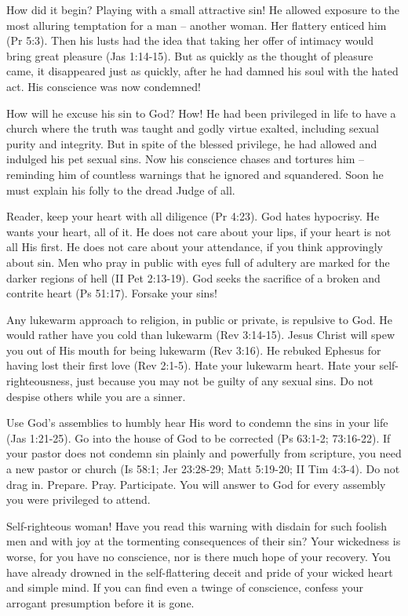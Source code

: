 How did it begin? Playing with a small attractive sin! He allowed exposure to the most alluring temptation for a man – another woman. Her flattery enticed him (Pr 5:3). Then his lusts had the idea that taking her offer of intimacy would bring great pleasure (Jas 1:14-15). But as quickly as the thought of pleasure came, it disappeared just as quickly, after he had damned his soul with the hated act. His conscience was now condemned!

How will he excuse his sin to God? How! He had been privileged in life to have a church where the truth was taught and godly virtue exalted, including sexual purity and integrity. But in spite of the blessed privilege, he had allowed and indulged his pet sexual sins. Now his conscience chases and tortures him – reminding him of countless warnings that he ignored and squandered. Soon he must explain his folly to the dread Judge of all. 

Reader, keep your heart with all diligence (Pr 4:23). God hates hypocrisy. He wants your heart, all of it. He does not care about your lips, if your heart is not all His first. He does not care about your attendance, if you think approvingly about sin. Men who pray in public with eyes full of adultery are marked for the darker regions of hell (II Pet 2:13-19). God seeks the sacrifice of a broken and contrite heart (Ps 51:17). Forsake your sins!

Any lukewarm approach to religion, in public or private, is repulsive to God. He would rather have you cold than lukewarm (Rev 3:14-15). Jesus Christ will spew you out of His mouth for being lukewarm (Rev 3:16). He rebuked Ephesus for having lost their first love (Rev 2:1-5). Hate your lukewarm heart. Hate your self-righteousness, just because you may not be guilty of any sexual sins. Do not despise others while you are a sinner.

Use God’s assemblies to humbly hear His word to condemn the sins in your life (Jas 1:21-25). Go into the house of God to be corrected (Ps 63:1-2; 73:16-22). If your pastor does not condemn sin plainly and powerfully from scripture, you need a new pastor or church (Is 58:1; Jer 23:28-29; Matt 5:19-20; II Tim 4:3-4). Do not drag in. Prepare. Pray. Participate. You will answer to God for every assembly you were privileged to attend.

Self-righteous woman! Have you read this warning with disdain for such foolish men and with joy at the tormenting consequences of their sin? Your wickedness is worse, for you have no conscience, nor is there much hope of your recovery. You have already drowned in the self-flattering deceit and pride of your wicked heart and simple mind. If you can find even a twinge of conscience, confess your arrogant presumption before it is gone.

